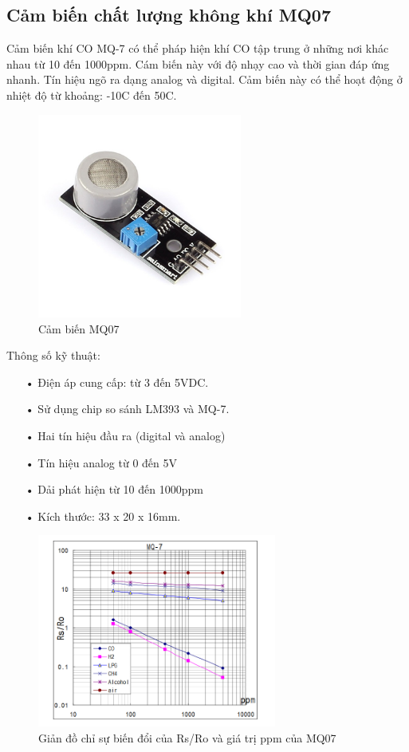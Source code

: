 \subsection{Cảm biến chất lượng không khí MQ07} 
Cảm biến khí CO MQ-7 có thể pháp hiện khí CO tập trung ở những nơi khác nhau từ 10 đến 1000ppm. Cám biến này với độ nhạy cao và thời gian đáp ứng nhanh. Tín hiệu ngõ ra dạng analog và digital. Cảm biến này có thể hoạt động ở nhiệt độ từ khoảng: -10C đến 50C.
\begin{figure}[H]
\centering    
\includegraphics[width=0.6\textwidth]{mq07}
\caption[Cảm biến MQ07]{Cảm biến MQ07}
\label{fig:mq07}
\end{figure}
Thông số kỹ thuật:
\begin{itemize}
\item[•]Điện áp cung cấp: từ 3 đến 5VDC.
\item[•]Sử dụng chip so sánh LM393 và MQ-7.
\item[•]Hai tín hiệu đầu ra (digital và analog)
\item[•]Tín hiệu analog từ 0 đến 5V 
\item[•]Dải phát hiện từ 10 đến 1000ppm
\item[•]Kích thước: 33 x 20 x 16mm.
\end{itemize}
\begin{figure}[H]
\centering    
\includegraphics[width=0.7\textwidth]{mq07_mqh1}
\caption[Giản đồ chỉ sự biến đổi của Rs/Ro và giá trị ppm của MQ07]{Giản đồ chỉ sự biến đổi của Rs/Ro và giá trị ppm của MQ07}
\label{fig:mq07_mqh1}
\end{figure}


